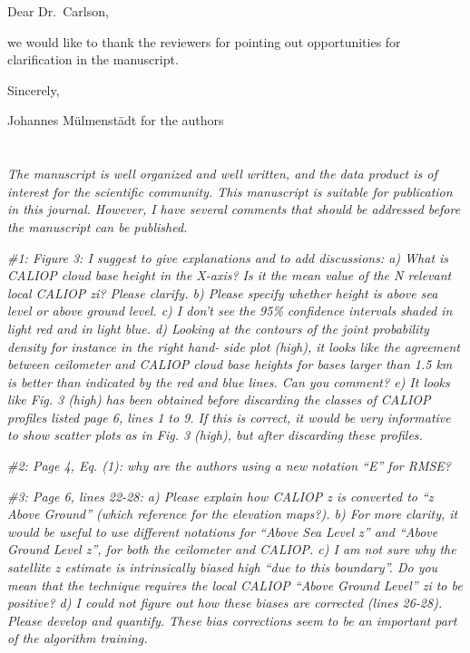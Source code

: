 \documentclass[12pt,a4paper]{responses}
\begin{document}
Dear Dr.~Carlson,

we would like to thank the reviewers for pointing out opportunities for
clarification in the manuscript.  

Sincerely,

Johannes M\"ulmenst\"adt for the authors

\section{}

\textit{The manuscript is well organized and well written, and the data product is of interest
for the scientific community.  This manuscript is suitable for publication in this journal.
However, I have several comments that should be addressed before the manuscript
can be published.}



\textit{\#1: Figure 3: I suggest to give explanations and to add discussions: a) What is CALIOP
cloud base height in the X-axis?  Is it the mean value of the N relevant local CALIOP
zi? Please clarify. b) Please specify whether height is above sea level or above ground
level.  c) I don’t see the 95\% confidence intervals shaded in light red and in light blue.
d) Looking at the contours of the joint probability density for instance in the right hand-
side plot (high), it looks like the agreement between ceilometer and CALIOP cloud base
heights for bases larger than 1.5 km is better than indicated by the red and blue lines.
Can you comment?  e) It looks like Fig.  3 (high) has been obtained before discarding
the classes of CALIOP profiles listed page 6, lines 1 to 9.  If this is correct, it would
be very informative to show scatter plots as in Fig. 3 (high), but after discarding these
profiles.}

\textit{\#2: Page 4, Eq. (1): why are the authors using a new notation “E” for
  RMSE?}

\textit{\#3:  Page 6, lines 22-28:  a) Please explain how CALIOP z is converted to “z Above
Ground” (which reference for the elevation maps?).  b) For more clarity,  it would be
useful  to  use  different  notations  for  “Above  Sea  Level  z”  and  “Above  Ground  Level
z”, for both the ceilometer and CALIOP. c) I am not sure why the satellite z estimate
is intrinsically biased high “due to this boundary”.   Do you mean that the technique
requires the local CALIOP “Above Ground Level” zi to be positive? d) I could not figure
out how these biases are corrected (lines 26-28). Please develop and quantify. These
bias corrections seem to be an important part of the algorithm training.}
\end{document}
